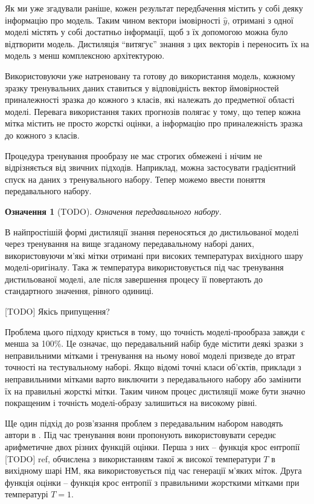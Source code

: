 \documentclass[14pt,a4paper]{extarticle}
\newcounter{e}
\newtheorem{defn}[theorem]{Означення}
\numberwithin{equation}{section}
\numberwithin{figure}{section}
\begin{document}
 Як ми уже згадували раніше, кожен результат передбачення містить у собі деяку інформацію про модель. Таким чином вектори імовірності $\hat{y}$, отримані з одної моделі містять у собі достатньо інформації, щоб з їх допомогою можна було відтворити модель. Дистиляція ``витягує'' знання з цих векторів і переносить їх на модель з менш комплексною архітектурою.
 
 Використовуючи уже натреновану та готову до використання модель, кожному зразку тренувальних даних ставиться у відповідність вектор ймовірностей приналежності зразка до кожного з класів, які належать до предметної області моделі. Перевага використання таких прогнозів полягає у тому, що тепер кожна мітка містить не просто жорсткі оцінки, а інформацію про приналежність зразка до кожного з класів.
 
 
 Процедура тренування прообразу не має строгих обмежені і нічим не відрізняється від звичних підходів. Наприклад, можна застосувати градієнтний спуск на даних з тренувального набору. Тепер можемо ввести поняття передавального набору.
 
 \begin{defn}
 	[TODO] Означення передавального набору.
 \end{defn}
 
 
 В найпростішій формі дистиляції знання переносяться до дистильованої моделі через тренування на вище згаданому передавальному наборі даних, використовуючи м'які мітки отримані при високих температурах вихідного шару моделі-оригіналу. Така ж температура використовується під час тренування дистильованої моделі, але після завершення процесу її повертають до стандартного значення, рівного одиниці.
 
 [TODO] Якісь припущення?
 
 Проблема цього підходу криється в тому, що точність моделі-прообраза завжди є менша за 100\%. Це означає, що передавальний набір буде містити деякі зразки з неправильними мітками і тренування на ньому нової моделі призведе до втрат точності на тестувальному наборі. Якщо відомі точні класи об'єктів, приклади з неправильними мітками варто виключити з передавального набору або замінити їх на правильні жорсткі мітки. Таким чином процес дистиляції може бути значно покращеним і точність моделі-образу залишиться на високому рівні.
 
 Ще один підхід до розв'язання проблем з передавальним набором наводять автори в \cite{distillation}. Під час тренування вони пропонують використовувати середнє арифметичне двох різних функцій оцінки. Перша з них -- функція крос ентропії [TODO] ref, обчислена з використанням такої ж високої температури $T$ в вихідному шарі НМ, яка використовується під час генерації м'яких міток. Друга функція оцінки -- функція крос ентропії з правильними жорсткими мітками при температурі $T=1$.
 
\end{document}

